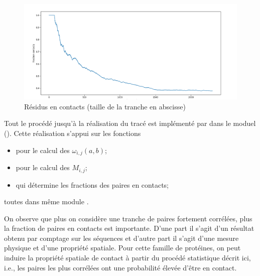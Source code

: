 \documentclass[a4paper, french]{article}
\begin{document}
\begin{figure}[h]
    \begin{center}
    \includegraphics[width=15cm]{images/contacts.png}
    \caption{R\'esidus en contacts (taille de la tranche en abscisse)}
    \label{fig:contacts}
    \end{center}
\end{figure}

Tout le proc\'ed\'e jusqu'\`a la r\'ealisation du trac\'e est impl\'ement\'e
par  dans le moduel  ().
Cette r\'ealisation s'appui sur les fonctions
\begin{itemize}
    \item {}
        pour le calcul des $\omega_{i,j}(a,b)$;
    \item {}
        pour le calcul des $M_{i,j}$;
    \item {}
        qui d\'etermine les fractions des paires en contacts;
\end{itemize}
toutes dans m\^eme module .

On observe que plus on consid\`ere une tranche de paires fortement 
corr\'el\'ees, plus la fraction de paires en contacts est importante.
D'une part il s'agit d'un r\'esultat obtenu par comptage sur les
s\'equences et d'autre part il s'agit d'une mesure physique et d'une
propri\'et\'e spatiale.
Pour cette famille de prot\'eines, on peut induire la propri\'et\'e
spatiale de contact \`a partir du proc\'ed\'e statistique d\'ecrit
ici, i.e., les paires les plus corr\'el\'ees ont une probabilit\'e
\'elev\'ee d'\^etre en contact.


\hspace{1in}
\end{document}
